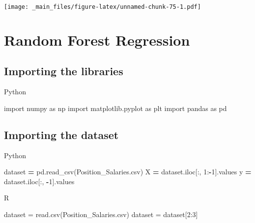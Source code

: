 \documentclass[
]{book}
\newenvironment{Shaded}{\begin{snugshade}}{\end{snugshade}}
\newcommand{\DecValTok}[1]{\textcolor[rgb]{0.00,0.00,0.81}{#1}}
\newcommand{\FunctionTok}[1]{\textcolor[rgb]{0.00,0.00,0.00}{#1}}
\newcommand{\ImportTok}[1]{#1}
\newcommand{\NormalTok}[1]{#1}
\newcommand{\OperatorTok}[1]{\textcolor[rgb]{0.81,0.36,0.00}{\textbf{#1}}}
\newcommand{\OtherTok}[1]{\textcolor[rgb]{0.56,0.35,0.01}{#1}}
\newcommand{\SpecialCharTok}[1]{\textcolor[rgb]{0.00,0.00,0.00}{#1}}
\newcommand{\StringTok}[1]{\textcolor[rgb]{0.31,0.60,0.02}{#1}}
\theoremstyle{definition}
\theoremstyle{definition}
\theoremstyle{definition}
\theoremstyle{definition}
\theoremstyle{remark}
\begin{document}
\texttt{[image: \_main\_files/figure-latex/unnamed-chunk-75-1.pdf]}

\hypertarget{random-forest-regression}{%
\section{Random Forest Regression}\label{random-forest-regression}}

\hypertarget{importing-the-libraries-6}{%
\subsection{Importing the libraries}\label{importing-the-libraries-6}}

Python

\begin{Shaded}
\begin{Highlighting}[]
\ImportTok{import}\NormalTok{ numpy }\ImportTok{as}\NormalTok{ np}
\ImportTok{import}\NormalTok{ matplotlib.pyplot }\ImportTok{as}\NormalTok{ plt}
\ImportTok{import}\NormalTok{ pandas }\ImportTok{as}\NormalTok{ pd}
\end{Highlighting}
\end{Shaded}

\hypertarget{importing-the-dataset-6}{%
\subsection{Importing the dataset}\label{importing-the-dataset-6}}

Python

\begin{Shaded}
\begin{Highlighting}[]
\NormalTok{dataset }\OperatorTok{=}\NormalTok{ pd.read\_csv(}\StringTok{\textquotesingle{}Position\_Salaries.csv\textquotesingle{}}\NormalTok{)}
\NormalTok{X }\OperatorTok{=}\NormalTok{ dataset.iloc[:, }\DecValTok{1}\NormalTok{:}\OperatorTok{{-}}\DecValTok{1}\NormalTok{].values}
\NormalTok{y }\OperatorTok{=}\NormalTok{ dataset.iloc[:, }\OperatorTok{{-}}\DecValTok{1}\NormalTok{].values}
\end{Highlighting}
\end{Shaded}

R

\begin{Shaded}
\begin{Highlighting}[]
\NormalTok{dataset }\OtherTok{=} \FunctionTok{read.csv}\NormalTok{(}\StringTok{\textquotesingle{}Position\_Salaries.csv\textquotesingle{}}\NormalTok{)}
\NormalTok{dataset }\OtherTok{=}\NormalTok{ dataset[}\DecValTok{2}\SpecialCharTok{:}\DecValTok{3}\NormalTok{]}
\end{Highlighting}
\end{Shaded}
\end{document}
